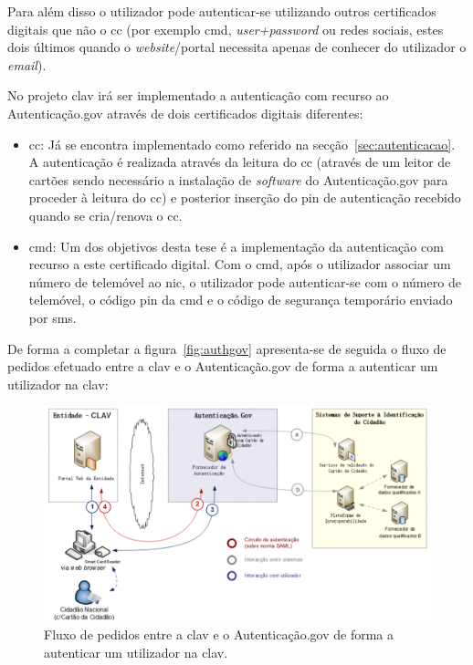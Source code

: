 Para além disso o utilizador pode autenticar-se utilizando outros certificados digitais que não o \acrshort{cc} (por exemplo \acrfull{cmd}, \textit{user+password} ou redes sociais, estes dois últimos quando o \textit{website}/portal necessita apenas de conhecer do utilizador o \textit{email}).

No projeto \acrshort{clav} irá ser implementado a autenticação com recurso ao Autenticação.gov através de dois certificados digitais diferentes:
\begin{itemize}
    \item \acrfull{cc}: Já se encontra implementado como referido na secção~\ref{sec:autenticacao}. A autenticação é realizada através da leitura do \acrshort{cc} (através de um leitor de cartões sendo necessário a instalação de \textit{software} do Autenticação.gov para proceder à leitura do \acrshort{cc}) e posterior inserção do \acrshort{pin} de autenticação recebido quando se cria/renova o \acrshort{cc}.
    \item \acrfull{cmd}: Um dos objetivos desta tese é a implementação da autenticação com recurso a este certificado digital. Com o \acrshort{cmd}, após o utilizador associar um número de telemóvel ao \acrshort{nic}, o utilizador pode autenticar-se com o número de telemóvel, o código \acrshort{pin} da \acrshort{cmd} e o código de segurança temporário enviado por \acrshort{sms}.
\end{itemize}

De forma a completar a figura~\ref{fig:authgov} apresenta-se de seguida o fluxo de pedidos efetuado entre a \acrshort{clav} e o Autenticação.gov de forma a autenticar um utilizador na \acrshort{clav}:~\cite{agov}
\begin{figure}[H]
    \begin{center}
        \includegraphics[width=1\textwidth]{img/fluxoauthgov.png}
    \end{center}
    \caption{Fluxo de pedidos entre a \acrshort{clav} e o Autenticação.gov de forma a autenticar um utilizador na \acrshort{clav}.~\cite{agov}}\label{fig:fluxoauthgov}
\end{figure}

